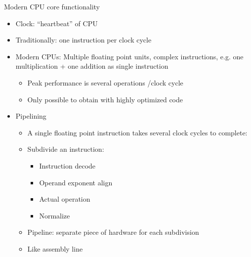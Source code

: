 \begin{frame}{Modern CPU core functionality}

  \begin{itemize}
    \tightlist
  \item Clock: ``heartbeat'' of CPU
  \item
    Traditionally: one instruction per clock cycle
  \item
    Modern CPUs: Multiple floating point units,
    complex instructions, e.g.
    one multiplication + one addition as single instruction

    \begin{itemize}
      \tightlist
    \item
      Peak performance is several operations /clock cycle
    \item
      Only possible to obtain with highly optimized code
    \end{itemize}
  \item
    Pipelining

    \begin{itemize}
      \tightlist
    \item
      A single floating point instruction takes several clock cycles to
      complete:
    \item
      Subdivide an instruction:

      \begin{itemize}
        \tightlist
      \item
        Instruction decode
      \item
        Operand exponent align
      \item
        Actual operation
      \item
        Normalize
      \end{itemize}
    \item
      Pipeline: separate piece of hardware for each subdivision
    \item
      Like assembly line
    \end{itemize}
  \end{itemize}

\end{frame}



